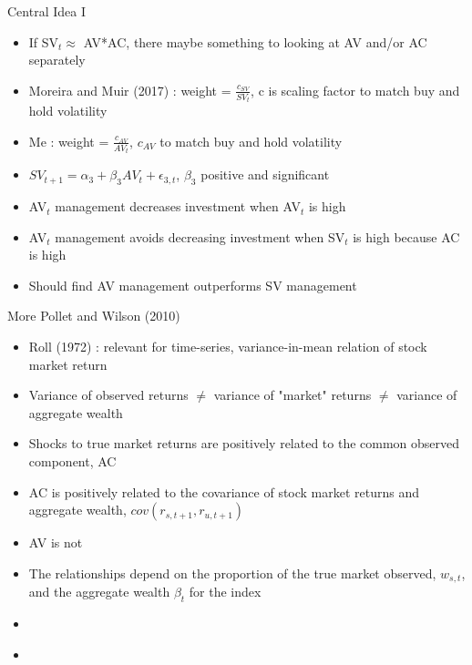 \documentclass[handout]{beamer}
\begin{document}
\begin{frame}{Central Idea I}
	\begin{itemize}[<+->]
		\item If SV$_{t} \approx$ AV*AC, there maybe something to looking at AV and/or AC separately
		\item Moreira and Muir (2017) : weight = $\frac{c_{SV}}{SV_{t}}$, c is scaling factor to match buy and hold volatility
		\item Me : weight = $\frac{c_{AV}}{AV_{t}}$, $c_{AV}$ to match buy and hold volatility
		\item $SV_{t+1} = \alpha_{3} + \beta_{3}AV_{t} + \epsilon_{3,t}$, $\beta_{3}$ positive and significant
		\item AV$_{t}$ management decreases investment when AV$_{t}$ is high 
		\item AV$_{t}$ management avoids decreasing investment when SV$_{t}$ is high because AC is high
		\item Should find AV management outperforms SV management
	\end{itemize}
\end{frame}

\begin{frame}{More Pollet and Wilson (2010)}
	\begin{itemize}[<+->]
		\item Roll (1972) : relevant for time-series, variance-in-mean relation of stock market return 
		\item Variance of observed returns $\neq$ variance of "market" returns $\neq$ variance of aggregate wealth
		\item Shocks to true market returns are positively related to the common observed component, AC
		\item AC is positively related to the covariance of stock market returns and aggregate wealth,  $cov(r_{s,t+1},r_{u,t+1})$
		\item AV is not
		\item The relationships depend on the proportion of the true market observed, $w_{s,t}$, and the aggregate wealth $\beta_{t}$ for the index
		\item \hyperlink{PWII}{}
		\item \hypertarget<8>{PWreturn}{}
	\end{itemize}
\end{frame}
\end{document}
